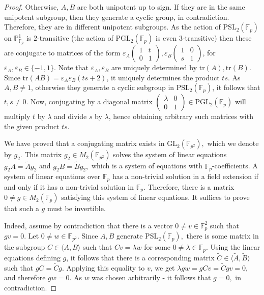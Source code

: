 \documentclass[letterpaper]{amsart}
\begin{document}
\begin{proof}
    Otherwise, $A,B$ are both unipotent up to sign. If they are in the same unipotent subgroup, then they generate a cyclic group, in contradiction. Therefore, they are in different unipotent subgroups. As the action of $\mathrm{PSL}_2(\mathbb{F}_p)$ on $\mathbb{P}^1_{\mathbb{F}_p}$ is $2$-transitive (the action of $\mathrm{PGL}_2(\mathbb{F}_p)$ is even $3$-transitive) then these are conjugate to matrices of the form $\varepsilon_A\begin{pmatrix}1 & t \\ 0 & 1\end{pmatrix},\varepsilon_B\begin{pmatrix}1 & 0 \\ s & 1\end{pmatrix}$, for $\varepsilon_A,\varepsilon_B \in \{-1, 1\}$. Note that $\varepsilon_A,\varepsilon_B$ are uniquely determined by $\mathrm{tr}(A),\mathrm{tr}(B)$. Since $\mathrm{tr}(AB) = \varepsilon_A\varepsilon_B(ts + 2)$, it uniquely determines the product $ts$. As $A,B\neq 1$, otherwise they generate a cyclic subgroup in $\mathrm{PSL}_2(\mathbb{F}_p)$, it follows that $t,s \neq 0$. Now, conjugating by a diagonal matrix $\begin{pmatrix}\lambda & 0 \\ 0 & 1\end{pmatrix} \in \mathrm{PGL}_2(\mathbb{F}_p)$ will multiply $t$ by $\lambda$ and divide $s$ by $\lambda$, hence obtaining arbitrary such matrices with the given product $ts$.

    We have proved that a conjugating matrix exists in $\mathrm{GL}_2(\mathbb{F}_{p^2}),$ which we denote by $g_2.$ This matrix $g_2 \in M_2(\mathbb{F}_{p^2})$ solves the system of linear equations $g_2A = \tilde{A} g_2$ and $g_2B = \tilde{B} g_2,$ which is a system of equations with $\mathbb{F}_p$-coefficients. A system of linear equations over $\mathbb{F}_p$ has a non-trivial solution in a field extension if and only if it has a non-trivial solution in $\mathbb{F}_p.$ Therefore, there is a matrix $0 \neq g \in M_2(\mathbb{F}_p)$ satisfying this system of linear equations. It suffices to prove that such a $g$ must be invertible.

    Indeed, assume by contradiction that there is a vector $0 \neq v \in \mathbb{F}_p^2$ such that $gv = 0.$ Let $0 \neq w \in \mathbb{F}_{p^2}.$ Since $A, B$ generate $\mathrm{PSL}_2(\mathbb{F}_p),$ there is some matrix in the subgroup $C \in \langle A, B \rangle$ such that $Cv = \lambda w$ for some $0 \neq \lambda \in \mathbb{F}_p.$ Using the linear equations defining $g$, it follows that there is a corresponding matrix $\tilde{C} \in \langle \tilde{A}, \tilde{B} \rangle$ such that $gC = \tilde{C} g.$ Applying this equality to $v$, we get $\lambda gw = gCv = \tilde{C} gv = 0,$ and therefore $gw = 0.$ As $w$ was chosen arbitrarily - it follows that $g = 0,$ in contradiction.
\end{proof}
\end{document}
